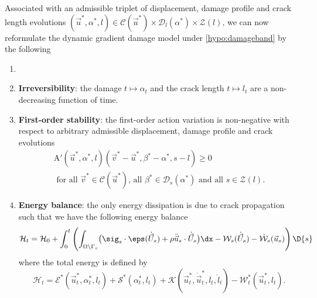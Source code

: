 Associated with an admissible triplet of displacement, damage profile and crack length evolutions $(\vec{u}^*,\alpha^*,l)\in\mathcal{C}(\vec{u}^*)\times\mathcal{D}_l(\alpha^*)\times\mathcal{Z}(l)$, we can now reformulate the dynamic gradient damage model under \cref{hypo:damageband} by the following
\begin{definition} \label{def:dynagraddamanew}
\begin{enumerate}
\item[]
\item \textbf{Irreversibility}: the damage $t\mapsto\alpha_t$ and the crack length $t\mapsto l_t$ are a non-decreasing function of time.
\item \textbf{First-order stability}: the first-order action variation is non-negative with respect to arbitrary admissible displacement, damage profile and crack evolutions
\begin{multline} \label{eq:vi2}
\mathrm{A}'(\vec{u}^*,\alpha^*,l)(\vec{v}^*-\vec{u}^*,\beta^*-\alpha^*,s-l)\geq 0 \\
\text{ for all $\vec{v}^*\in\mathcal{C}(\vec{u}^*)$, all $\beta^*\in\mathcal{D}_s(\alpha^*)$ and all $s\in\mathcal{Z}(l)$}.
\end{multline}
\item \textbf{Energy balance}: the only energy dissipation is due to crack propagation such that we have the following energy balance
\begin{equation} \label{eq:dyngdeb3}
\mathcal{H}_t=\mathcal{H}_0+\int_0^t\left(\int_{\Omega\setminus\Gamma_s}\bigl(\sig_s\cdot\eps(\dot{\vec{U}}_s)+\rho\ddot{\vec{u}}_s\cdot\dot{\vec{U}}_s\bigr)\dx-\mathcal{W}_s(\dot{\vec{U}}_s)-\dot{\mathcal{W}}_s(\vec{u}_s)\right)\D{s}
\end{equation}
where the total energy is defined by
\begin{equation}
\mathcal{H}_t=\mathcal{E}^*(\vec{u}_t^*,\alpha_t^*,l_t)+\mathcal{S}^*(\alpha_t^*,l_t)+\mathcal{K}(\vec{u}_t^*,\dot{\vec{u}}_t^*,l_t,\dot{l}_t)-\mathcal{W}_t^*(\vec{u}_t^*,l_t).
\end{equation}
\end{enumerate}
\end{definition}


